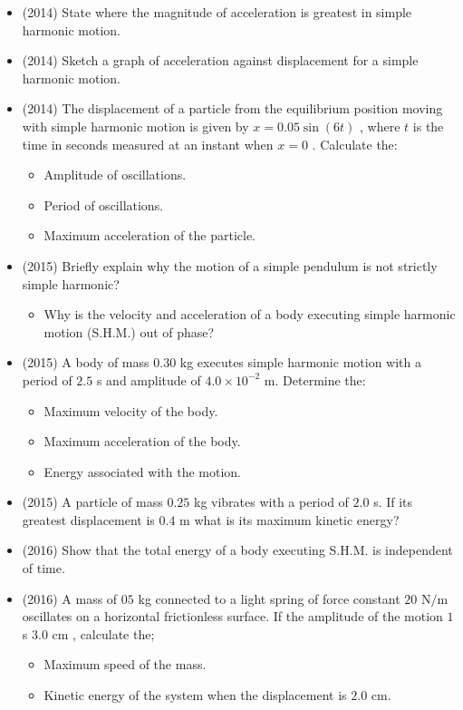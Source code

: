 \documentclass{article}
\begin{document}
\begin{itemize}
\item (2014)  State where the magnitude of acceleration is greatest in simple harmonic motion.
\item (2014)  Sketch a graph of acceleration against displacement for a simple harmonic motion.
\item (2014)  The displacement of a particle from the equilibrium position moving with simple harmonic motion is given by $ x=0.05 \sin(6t)$ , where $ t$ is the time in seconds measured at an instant when $ x=0$ .  Calculate the:\begin{itemize}
\item Amplitude of oscillations.
\item Period of oscillations. 
\item  Maximum acceleration of the particle. 
\end{itemize}
\item (2015)  Briefly explain why the motion of a simple pendulum is not strictly simple harmonic? \begin{itemize}
\item Why is the velocity and acceleration of a body executing simple harmonic motion (S.H.M.) out of phase? 
\end{itemize}
\item (2015)  A body of mass $ 0.30$ kg executes simple harmonic motion with a period of $ 2.5$ s and amplitude of $ 4.0\times10^{-2}$ m. Determine the:\begin{itemize}
\item Maximum velocity of the body. 
\item Maximum acceleration of the body. 
\item Energy associated with the motion.
\end{itemize}
\item (2015)  A particle of mass $ 0.25$ kg vibrates with a period of $ 2.0$ s. If its greatest displacement is $ 0.4$ m what is its maximum kinetic energy?
\item (2016)  Show that the total energy of a body executing S.H.M. is independent of time.
\item (2016)  A mass of $ 05$ kg connected to a light spring of force constant $ 20$ N$/$m oscillates on a  horizontal frictionless surface. If the amplitude of the motion $ 1$ s $ 3.0$ cm , calculate the;\begin{itemize}
\item Maximum speed of the mass.
\item  Kinetic energy of the system when the displacement is $ 2.0$ cm.

\end{itemize}
\end{itemize}
\end{document}

